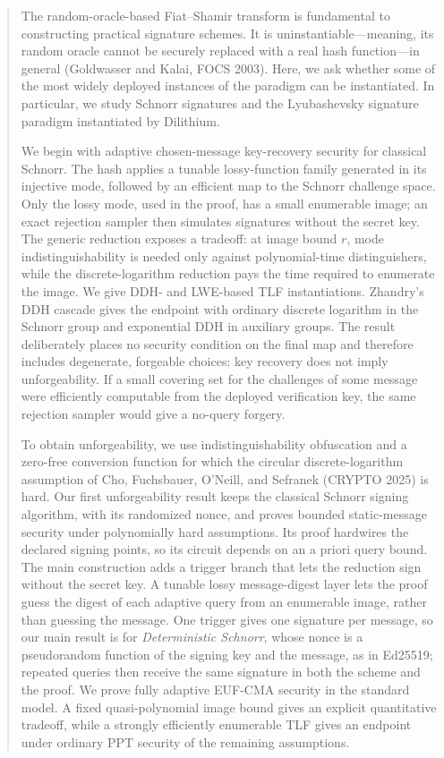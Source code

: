 \documentclass[twoside,envcountsame,runningheads]{llncs}
\begin{document}
\begin{abstract}
    The random-oracle-based Fiat--Shamir transform is fundamental to constructing practical signature schemes. It is uninstantiable---meaning, its random oracle cannot be securely replaced with a real hash function---in general (Goldwasser and Kalai, FOCS 2003). Here, we ask whether some of the most widely deployed instances of the paradigm can be instantiated. In particular, we study Schnorr signatures and the Lyubashevsky signature paradigm instantiated by Dilithium.

   \quad\quad We begin with adaptive chosen-message key-recovery security for classical Schnorr. The hash applies a tunable lossy-function family generated in its injective mode, followed by an efficient map to the Schnorr challenge space. Only the lossy mode, used in the proof, has a small enumerable image; an exact rejection sampler then simulates signatures without the secret key. The generic reduction exposes a tradeoff: at image bound $r$, mode indistinguishability is needed only against polynomial-time distinguishers, while the discrete-logarithm reduction pays the time required to enumerate the image. We give DDH- and LWE-based TLF instantiations. Zhandry's DDH cascade gives the endpoint with ordinary discrete logarithm in the Schnorr group and exponential DDH in auxiliary groups. The result deliberately places no security condition on the final map and therefore includes degenerate, forgeable choices: key recovery does not imply unforgeability. If a small covering set for the challenges of some message were efficiently computable from the deployed verification key, the same rejection sampler would give a no-query forgery.

   \quad\quad To obtain unforgeability, we use indistinguishability obfuscation and a zero-free conversion function for which the circular discrete-logarithm assumption of Cho, Fuchsbauer, O'Neill, and Sefranek (CRYPTO 2025) is hard. Our first unforgeability result keeps the classical Schnorr signing algorithm, with its randomized nonce, and proves bounded static-message security under polynomially hard assumptions. Its proof hardwires the declared signing points, so its circuit depends on an a priori query bound. The main construction adds a trigger branch that lets the reduction sign without the secret key. A tunable lossy message-digest layer lets the proof guess the digest of each adaptive query from an enumerable image, rather than guessing the message. One trigger gives one signature per message, so our main result is for \emph{Deterministic Schnorr}, whose nonce is a pseudorandom function of the signing key and the message, as in Ed25519; repeated queries then receive the same signature in both the scheme and the proof. We prove fully adaptive EUF-CMA security in the standard model. A fixed quasi-polynomial image bound gives an explicit quantitative tradeoff, while a strongly efficiently enumerable TLF gives an endpoint under ordinary PPT security of the remaining assumptions.
    

\end{abstract}
\end{document}
